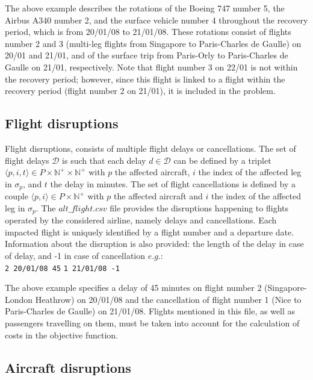 \documentclass[ijoo,nonblindrev]{informs-ijoo}
\begin{document}
The above example describes the rotations of the Boeing 747 number 5, the Airbus A340 number 2, and the surface vehicle number 4 throughout the recovery period, which is from 20/01/08 to 21/01/08. These rotations consist of flights number 2 and 3 (multi-leg flights from Singapore to Paris-Charles de Gaulle) on 20/01 and 21/01, and of the surface trip from Paris-Orly to Paris-Charles de Gaulle on 21/01, respectively. Note that flight number 3 on 22/01 is not within the recovery period; however, since this flight is linked to a flight within the recovery period (flight number 2 on 21/01), it is included in the problem.

\subsection{Flight disruptions} \label{subsec:flightDisr}


	Flight disruptions, consists of multiple flight delays or cancellations. The set of flight delays $ \mathcal{D} $ is such that each delay $ d \in \mathcal{D}$ can be defined by a triplet $\langle p, i, t \rangle \in P \times \mathbb{N}^{+}  \times \mathbb{N}^{+}$ with $p$ the affected aircraft, $i$ the index of the affected leg in $ \sigma_p$, and $t$ the delay in minutes. The set of flight cancellations is defined by a couple $\langle p,i \rangle \in  P \times \mathbb{N}^{+}$ with $p$ the affected aircraft and $i$ the index of the affected leg in $ \sigma_p$.
	The $alt\_flight.csv$ file provides the disruptions happening to flights operated by the considered airline, namely delays and cancellations. Each impacted flight is uniquely identified by a flight number and a departure date. Information about the disruption is also provided: the length of the delay in case of delay, and -1 in
	case of cancellation $e.g.$:\\
	\newline
	{\texttt{\footnotesize 2 20/01/08 45}}
	\newline
	{\texttt{\footnotesize 1 21/01/08 -1}}
	\newline
	
	The above example specifies a delay of 45 minutes on flight number 2 (Singapore-London Heathrow) on 20/01/08 and the cancellation of flight number 1 (Nice to Paris-Charles de Gaulle) on 21/01/08.
	Flights mentioned in this file, as well as passengers travelling on them, must be taken into account for the calculation of costs in the objective function.
	
\subsection{Aircraft disruptions} \label{subsec:aircraftDisr}
\end{document}
